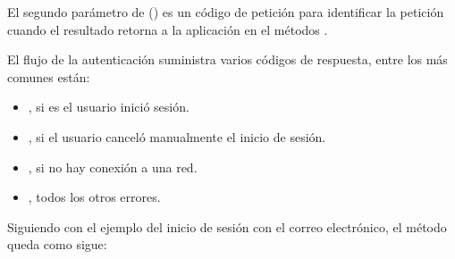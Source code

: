 El segundo parámetro de  ()  es un
código de petición para identificar la petición cuando el resultado retorna
a la aplicación en el métodos .

El flujo de la autenticación suministra varios códigos de respuesta, entre
los más comunes están:
\begin{itemize}
\item {} 
, si es el usuario inició sesión.

\item {} 
, si el usuario canceló manualmente el inicio de sesión.

\item {} 
, si no hay conexión a una red.

\item {} 
,  todos los otros errores.

\end{itemize}

Siguiendo con el ejemplo del inicio de sesión con el correo electrónico,
el método  queda como sigue:


